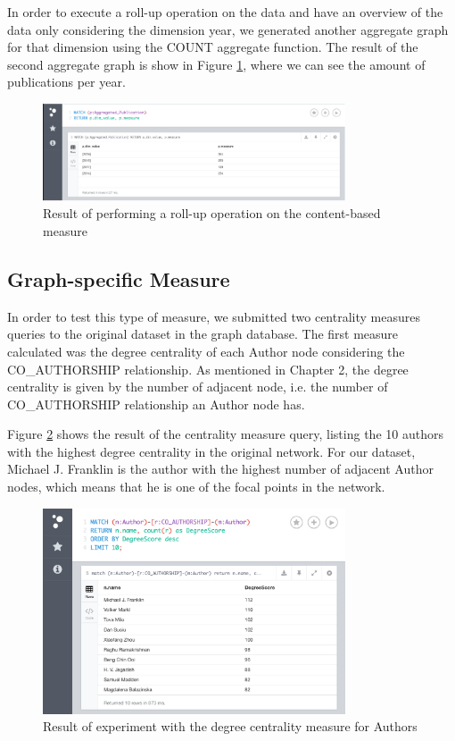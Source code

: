 In order to execute a roll-up operation on the data and have an overview of the data only considering the dimension year, we generated another aggregate graph for that dimension using the COUNT aggregate function. The result of the second aggregate graph is show in Figure \ref{fig:figure342}, where we can see the amount of publications per year.

\begin{figure}[!h]
\centering
\includegraphics[width=0.8\textwidth]{../exp_content_measure_rollup_2.png}
\caption{Result of performing a roll-up operation on the content-based measure}
\label{fig:figure342}
\end{figure}

\subsection{Graph-specific Measure}

In order to test this type of measure, we submitted two centrality measures queries to the original dataset in the graph database. The first measure calculated was the degree centrality of each Author node considering the CO\_AUTHORSHIP relationship. As mentioned in Chapter 2, the degree centrality is given by the number of adjacent node, i.e. the number of CO\_AUTHORSHIP relationship an Author node has.

Figure \ref{fig:figure35} shows the result of the centrality measure query, listing the 10 authors with the highest degree centrality in the original network. For our dataset, Michael J. Franklin is the author with the highest number of adjacent Author nodes, which means that he is one of the focal points in the network.

\begin{figure}[!h]
\centering
\includegraphics[width=0.8\textwidth]{../exp_degree_centrality.png}
\caption{Result of experiment with the degree centrality measure for Authors}
\label{fig:figure35}
\end{figure}

